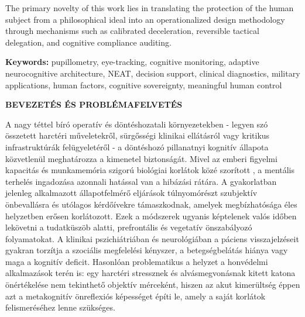 \documentclass[12pt,a4paper,oneside]{book}
\begin{document}
The primary novelty of this work lies in translating the protection of the human subject from a philosophical ideal into an operationalized design methodology through mechanisms such as calibrated deceleration, reversible tactical delegation, and cognitive compliance auditing.

\vspace{0.3cm}
\textbf{Keywords:} pupillometry, eye-tracking, cognitive monitoring, adaptive neurocognitive architecture, NEAT, decision support, clinical diagnostics, military applications, human factors, cognitive sovereignty, meaningful human control

\newpage
\renewcommand{\contentsname}{Tartalomjegyzék}
\tableofcontents
\thispagestyle{empty}

\newpage
\thispagestyle{plain}
\begin{center}
    \vspace*{1cm}
    {\LARGE \textbf{BEVEZETÉS ÉS PROBLÉMAFELVETÉS}}
    \vspace*{1cm}
\end{center}

A nagy téttel bíró operatív és döntéshozatali környezetekben - legyen szó összetett harctéri műveletekről, sürgősségi klinikai ellátásról vagy kritikus infrastruktúrák felügyeletéről - a döntéshozó pillanatnyi kognitív állapota közvetlenül meghatározza a kimenetel biztonságát. Mivel az emberi figyelmi kapacitás és munkamemória szigorú biológiai korlátok közé szorított \cite{kahneman1973, cowan2010}, a mentális terhelés ingadozása azonnali hatással van a hibázási rátára. A gyakorlatban jelenleg alkalmazott állapotfelmérő eljárások túlnyomórészt szubjektív önbevallásra és utólagos kérdőívekre támaszkodnak, amelyek megbízhatósága éles helyzetben erősen korlátozott. Ezek a módszerek ugyanis képtelenek valós időben lekövetni a tudatküszöb alatti, prefrontális és vegetatív önszabályozó folyamatokat. A klinikai pszichiátriában és neurológiában a páciens visszajelzéseit gyakran torzítja a szociális megfelelési kényszer, a betegségbelátás hiánya vagy maga a kognitív deficit. Hasonlóan problematikus a helyzet a honvédelmi alkalmazások terén is: egy harctéri stressznek és alvásmegvonásnak kitett katona önértékelése nem tekinthető objektív mérceként, hiszen az akut kimerültség éppen azt a metakognitív önreflexiós képességet építi le, amely a saját korlátok felismeréséhez lenne szükséges.
\end{document}
